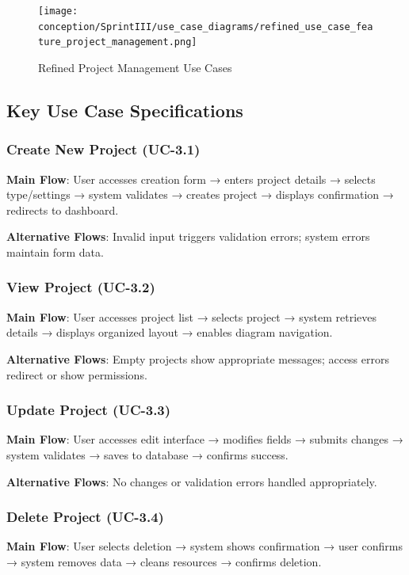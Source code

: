 \begin{figure}[H]
\centering
\texttt{[image: conception/SprintIII/use\_case\_diagrams/refined\_use\_case\_feature\_project\_management.png]}
\caption{Refined Project Management Use Cases}
\label{fig:refined_use_case_project_mgmt}
\end{figure}

\subsection{Key Use Case Specifications}

\subsubsection{Create New Project (UC-3.1)}
\textbf{Main Flow}: User accesses creation form → enters project details → selects type/settings → system validates → creates project → displays confirmation → redirects to dashboard.

\textbf{Alternative Flows}: Invalid input triggers validation errors; system errors maintain form data.

\subsubsection{View Project (UC-3.2)}
\textbf{Main Flow}: User accesses project list → selects project → system retrieves details → displays organized layout → enables diagram navigation.

\textbf{Alternative Flows}: Empty projects show appropriate messages; access errors redirect or show permissions.

\subsubsection{Update Project (UC-3.3)}
\textbf{Main Flow}: User accesses edit interface → modifies fields → submits changes → system validates → saves to database → confirms success.

\textbf{Alternative Flows}: No changes or validation errors handled appropriately.

\subsubsection{Delete Project (UC-3.4)}
\textbf{Main Flow}: User selects deletion → system shows confirmation → user confirms → system removes data → cleans resources → confirms deletion.

